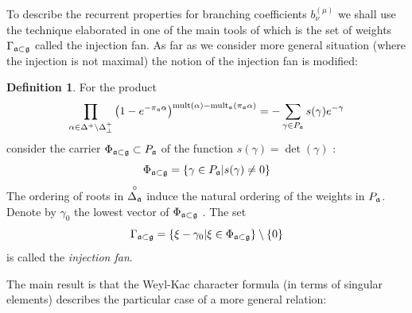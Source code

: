 \documentclass[12pt]{iopart}
\theoremstyle{definition}
\theoremstyle{definition}
\theoremstyle{definition}
\theoremstyle{definition}
\newtheorem{definition}{Definition}
\newcommand{\co}[1]{\stackrel{\circ }{#1}}
\begin{document}
To describe the recurrent properties for branching coefficients $b_{\nu
}^{(\mu )}$ we shall use the technique elaborated in \cite{ilyin812pbc} one of the
main tools of which is the set of weights $\Gamma _{\frak{a}\subset \frak{g}%
} $ called the injection fan. As far as we consider more general situation
(where the injection is not maximal) the notion of the injection fan is
modified:

\begin{definition}
\label{fan-definition} For the product
\begin{equation}
\prod_{\alpha \in \Delta ^{+}\setminus \Delta _{\bot }^{+}}\left( 1-e^{-\pi
_{\frak{a}}\alpha }\right) ^{\mathrm{mult}(\alpha )-\mathrm{mult}_{\frak{a}%
}(\pi _{\frak{a}}\alpha )}=-\sum_{\gamma \in P_{\frak{a}}}s(\gamma
)e^{-\gamma }  \label{eq:6}
\end{equation}
consider the carrier $\Phi _{\frak{a}\subset \frak{g}}\subset P_{\frak{a}}$
of the function $s(\gamma )=\det \left( \gamma \right) $ :
\begin{equation}
\Phi _{\frak{a}\subset \frak{g}}=\left\{ \gamma \in P_{\frak{a}}|s(\gamma
)\neq 0\right\}   \label{eq:37}
\end{equation}
The ordering of roots in $\co{\Delta _{\frak{a}}}$ induce the
natural ordering of the weights in $P_{\frak{a}}$. Denote by $\gamma _{0}$
the lowest vector of $\Phi _{\frak{a}\subset \frak{g}}$ . The set
\begin{equation}
\Gamma _{\frak{a}\subset \frak{g}}=\left\{ \xi -\gamma _{0}|\xi \in \Phi _{%
\frak{a}\subset \frak{g}}\right\} \setminus \left\{ 0\right\}
\label{fan-defined}
\end{equation}
is called the \textit{injection fan}.
\end{definition}

The main result is that the Weyl-Kac character formula (in terms of singular
elements) describes the particular case of a more general relation:
\end{document}
